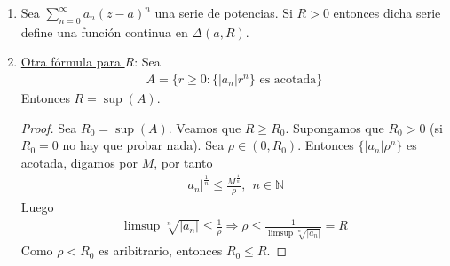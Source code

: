 \begin{obs}
    \begin{enumerate}
        \item Sea $\sum_{n=0}^{\infty}{a_n(z-a)^n}$ una serie de potencias. Si $R > 0$ entonces dicha serie define una función continua en $\Delta(a,R)$.
        \item \underline{Otra fórmula para $R$}: Sea
              \begin{align*}
                  A = \{ r \ge 0 : \{|a_n|r^n\} \text{ es acotada}\}
              \end{align*}
              Entonces $R = \sup(A)$.
              \begin{proof}
                  Sea $R_0 = \sup(A)$. Veamos que $R \ge R_0$. Supongamos que $R_0 > 0$ (si $R_0 = 0$ no hay que probar nada). Sea $\rho \in (0,R_0)$. Entonces $\{|a_n|\rho^n\}$ es acotada, digamos por $M$, por tanto
                  \begin{align*}
                      |a_n|^{\frac{1}{n}} \leq \frac{M^{\frac{1}{n}}}{\rho}, \ \ n \in \mathbb{N}
                  \end{align*}
                  Luego
                  \begin{align*}
                      \limsup{\sqrt[n]{|a_n|}} \leq \frac{1}{\rho} \Longrightarrow \rho \leq \frac{1}{\limsup{\sqrt[n]{|a_n|}}} = R
                  \end{align*}
                  Como $\rho < R_0$ es aribitrario, entonces $R_0 \leq R$.


\end{proof}
\end{enumerate}
\end{obs}

